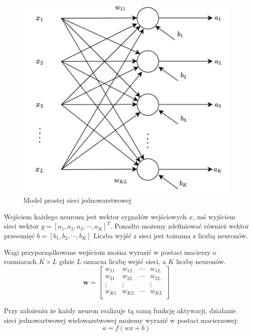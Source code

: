 \documentclass[12pt,twoside]{article}
\begin{document}
\begin{figure}[ht]
	\centering
	\includegraphics[width=12cm]{figures/models/singleLayerModel.png}
	\caption{Model prostej sieci jednowarstwowej}
	\label{Fig:singleNetwork}
\end{figure}

Wejściem każdego neuronu jest wektor sygnałów wejściowych $x$, zaś wyjściem sieci wektor $y = \left[ a_1, a_2, a_3, \cdots, a_K \right]^T$.
Ponadto możemy zdefiniować również wektor przesunięć $b = \left[ b_1, b_2, \cdots, b_K \right]$
Liczba wyjść z sieci jest tożsama z liczbą neuronów.

Wagi przyporządkowane wejściom można wyrazić w postaci macierzy o rozmiarach $K \times L$ gdzie $L$ oznacza liczbę wejść sieci, a $K$ liczbę neuronów.
$$\bm{w} = \left[
	\begin{array}{cccc}
		w_{11} & w_{12} & \cdots & w_{1L} \\
		w_{21} & w_{22} & \cdots & w_{2L} \\
		\vdots & \vdots &  & \vdots \\
		w_{K1} & w_{K2} & \cdots & w_{KL} \\
	\end{array}
	\right]$$

Przy założeniu że każdy neuron realizuje tą samą funkcję aktywacji, działanie sieci jednowartwowej wielowarstwowej możemy wyrazić w postaci macierzowej:
\begin{equation}
	\label{eq:singleLayerOut}
	a = f\left( wx + b \right)
\end{equation}
\end{document}
